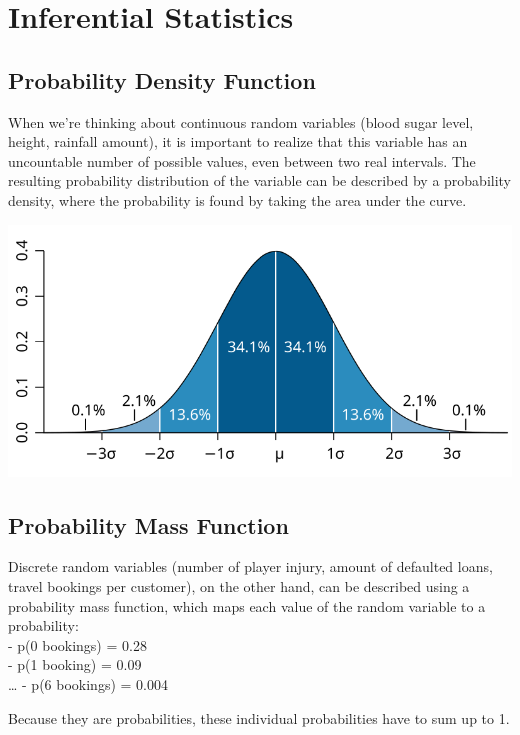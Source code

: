 \documentclass[]{article}
\begin{document}
\hypertarget{inferential-statistics}{%
\section{Inferential Statistics}\label{inferential-statistics}}

\hypertarget{probability-density-function}{%
\subsection{Probability Density
Function}\label{probability-density-function}}

When we're thinking about continuous random variables (blood sugar
level, height, rainfall amount), it is important to realize that this
variable has an uncountable number of possible values, even between two
real intervals. The resulting probability distribution of the variable
can be described by a probability density, where the probability is
found by taking the area under the curve.

\includegraphics{assets/pdf.svg}

\hypertarget{probability-mass-function}{%
\subsection{Probability Mass Function}\label{probability-mass-function}}

Discrete random variables (number of player injury, amount of defaulted
loans, travel bookings per customer), on the other hand, can be
described using a probability mass function, which maps each value of
the random variable to a probability:\\
- p(0 bookings) = 0.28\\
- p(1 booking) = 0.09\\
\ldots{} - p(6 bookings) = 0.004

Because they are probabilities, these individual probabilities have to
sum up to 1.
\end{document}
